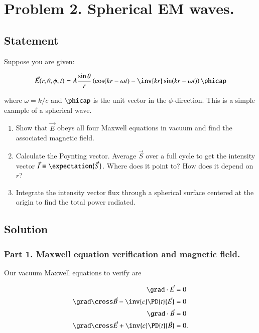 \section{Problem 2.  Spherical EM waves.}

\subsection{Statement}

Suppose you are given:

\begin{equation}\label{eqn:relElectroDynProblemSet4:400}
\vec{E}(r, \theta, \phi, t) = A \frac{\sin\theta}{r} \left( \cos(k r - \omega t) - \inv{k r} \sin(k r - \omega t) \right) \phicap
\end{equation}

where $\omega = k/c$ and $\phicap$ is the unit vector in the $\phi$-direction.  This is a simple example of a spherical wave.

\begin{enumerate}
\item Show that $\vec{E}$ obeys all four Maxwell equations in vacuum and find the associated magnetic field.
\item Calculate the Poynting vector.  Average $\vec{S}$ over a full cycle to get the intensity vector $\vec{I} \equiv \expectation{\vec{S}}$.  Where does it point to?  How does it depend on $r$?
\item Integrate the intensity vector flux through a spherical surface centered at the origin to find the total power radiated.
\end{enumerate}

\subsection{Solution}

\subsubsection{Part 1.  Maxwell equation verification and magnetic field.}

Our vacuum Maxwell equations to verify are

\begin{align}\label{eqn:relElectroDynProblemSet4:420}
\grad \cdot \vec{E} &= 0 \\
\grad \cross \vec{B} -\inv{c} \PD{t}{\vec{E}} &= 0 \\
\grad \cdot \vec{B} &= 0 \\
\grad \cross \vec{E} +\inv{c} \PD{t}{\vec{B}} &= 0.
\end{align}

